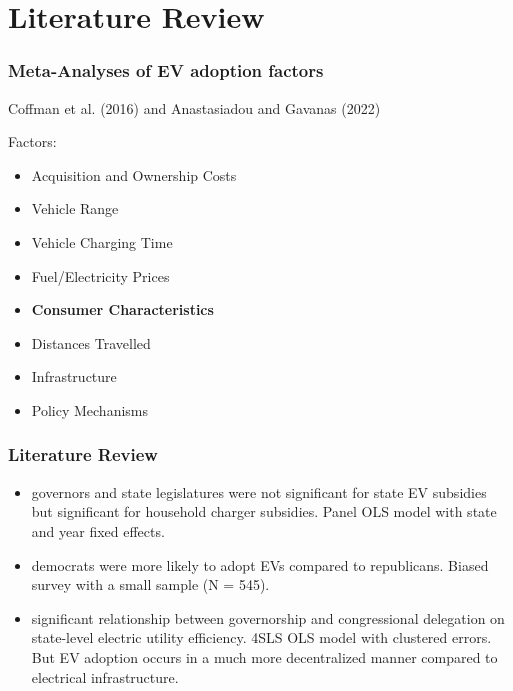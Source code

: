 \documentclass{beamer}
\begin{document}
\section{Literature Review}

\begin{frame}
\frametitle{Meta-Analyses of EV adoption factors}
Coffman et al. (2016) and Anastasiadou and Gavanas (2022)

Factors:
\begin{itemize}
    \item Acquisition and Ownership Costs
    \item Vehicle Range
    \item Vehicle Charging Time
    \item Fuel/Electricity Prices
    \item \textbf{Consumer Characteristics}
    \item Distances Travelled 
    \item Infrastructure 
    \item Policy Mechanisms
\end{itemize}
\end{frame}

\begin{frame}
\frametitle{Literature Review}

\begin{itemize}
    \item {} governors and state legislatures were not significant for state EV subsidies but significant for household charger subsidies. Panel OLS model with state and year fixed effects.
    \item {} democrats were more likely to adopt EVs compared to republicans. Biased survey with a small sample (N = 545).
    \item {} significant relationship between governorship and congressional delegation on state-level electric utility efficiency. 4SLS OLS model with clustered errors. But EV adoption occurs in a much more decentralized manner compared to electrical infrastructure.
\end{itemize}
\end{frame}
\end{document}
